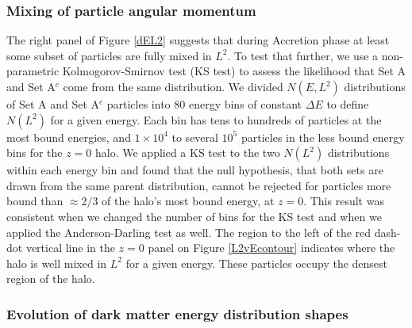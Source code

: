\documentclass[a4paper,11pt]{article}
\begin{document}
\subsubsection{Mixing of particle angular momentum}\label{DML2relax} 

The right panel of Figure \ref{dEL2} suggests that during Accretion phase at least some subset of particles are fully mixed in $L^2$.  To test that further, we use a 
non-parametric Kolmogorov-Smirnov test (KS test) to assess the likelihood that Set A and Set A$^c$ come from the same distribution.  We divided $N(E,L^2)$ 
distributions of 
Set A and Set A$^c$ particles into 80 energy bins of constant $\Delta E$ to define $N(L^2)$ for a given energy.  Each bin has tens to hundreds of particles at the most 
bound energies, and $1\times10^4$ to several $10^5$ particles in the less bound energy bins for the $z=0$ halo.  We applied a KS test to the two 
$N(L^2)$ distributions within each energy bin and found that the null hypothesis, that both sets are drawn from the same parent distribution, cannot be 
rejected for particles more bound than $\approx2/3$ of the halo's most bound energy, at $z=0$.  This result was consistent when we changed 
the number of bins for the KS test and when we applied the Anderson-Darling test as well.  The region to the left of the red dash-dot 
vertical line in the $z=0$ panel on Figure \ref{L2vEcontour} indicates where the halo is well mixed in $L^2$ for a given energy.  These particles occupy the 
densest region of the halo.  


\subsubsection{Evolution of dark matter energy distribution shapes}

\end{document}
